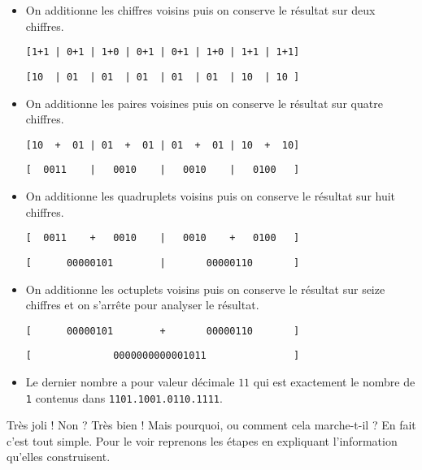 \documentclass[12pt]{amsart}
\begin{document}
\begin{itemize}[label=\small\textbullet]
	\item On additionne les chiffres voisins puis on conserve le résultat sur deux chiffres.
	
	\begin{center}
	\verb-[1+1 | 0+1 | 1+0 | 0+1 | 0+1 | 1+0 | 1+1 | 1+1]-

	\verb-[10  | 01  | 01  | 01  | 01  | 01  | 10  | 10 ]-
	\end{center}


	\item On additionne les paires voisines puis on conserve le résultat sur quatre chiffres.
	
	\begin{center}
	\verb-[10  +  01 | 01  +  01 | 01  +  01 | 10  +  10]-

	\verb-[  0011    |   0010    |   0010    |   0100   ]-
	\end{center}


	\item On additionne les quadruplets voisins puis on conserve le résultat sur huit chiffres.

	\begin{center}
	\verb-[  0011    +   0010    |   0010    +   0100   ]-

	\verb-[      00000101        |       00000110       ]-
	\end{center}


	\item On additionne les octuplets voisins puis on conserve le résultat sur seize chiffres et on s'arrête pour analyser le résultat.

	\begin{center}
	\verb-[      00000101        +       00000110       ]-

	\verb-[              0000000000001011               ]-
	\end{center}
	
	
	\item Le dernier nombre a pour valeur décimale $11$ qui est exactement le nombre de \verb+1+ contenus dans \verb+1101.1001.0110.1111+.
\end{itemize}




Très joli ! Non ? Très bien ! Mais pourquoi, ou comment cela marche-t-il ? En fait c'est tout simple. Pour le voir reprenons les étapes en expliquant l'information qu'elles construisent.
\end{document}
